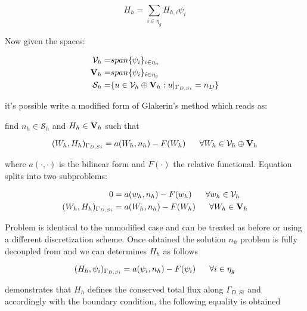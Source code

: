 \begin{equation}
H_h = \sum_{i\in\eta_g} H_{h,i} \psi_i 
\end{equation}


Now given the spaces:

\begin{align*}
\mathcal{V}_h = & span\{\psi_i\}_{i \in \eta_n} \\
\mathbf{V}_h = & span\{\psi_i\}_{i \in \eta_g}  \\
\mathcal{S}_h = & \{u \in \mathcal{V}_h \oplus \mathbf{V}_h: u|_{\Gamma_{D,Si}} = n_D \}
\end{align*}

it's possible write a modified form of Glakerin's method which reads as: 

find $n_h  \in \mathcal{S}_h$ and $H_h \in \mathbf{V}_h$ such that

\begin{equation}
\label{eq: modified galerkin}
(W_h,H_h)_{\Gamma_{D,Si}} = a(W_h,n_h)-F(W_h) \psp{10} \forall W_h \in \mathcal{V}_h \oplus \vect{V}_h
\end{equation}

where $a(\cdot,\cdot)$ is the bilinear form  and $F(\cdot)$ the relative functional.
Equation  splits into two subproblems:

\begin{align}
0  & = a(w_h,n_h)-F(w_h) \psp{10} \forall w_h \in \mathcal{V}_h \label{eq: usual problem}\\
(W_h,H_h)_{\Gamma_{D,Si}} & = a(W_h,n_h)-F(W_h) \psp{10} \forall W_h \in \vect{V}_h \label{eq: flux problem}
\end{align}

Problem  is identical to the unmodified case and can be treated as before or using a different discretization scheme. Once obtained the solution $n_h$ problem  is fully decoupled from  and we can determines $H_h$ as follows

\begin{equation}
\label{eq: flux problem complete}
(H_h,\psi_i)_{\Gamma_{D,Si}} = a(\psi_i,n_h)-F(\psi_i) \psp{10} \forall i \in \eta_g 
\end{equation} 


\cite{GalerkMethConsHughes} demonstrates that $H_h$ defines the conserved total flux along $\Gamma_{D,Si}$ and accordingly with the boundary condition, the following equality is obtained


